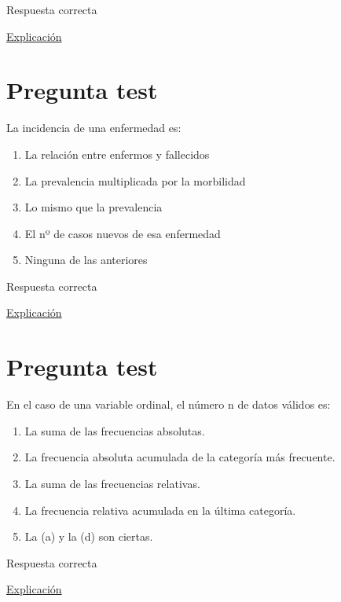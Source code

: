 \documentclass[
]{book}
\providecommand{\tightlist}{%
  \setlength{\itemsep}{0pt}\setlength{\parskip}{0pt}}
\begin{document}
Respuesta correcta

\href{https://www.salusplay.com/apuntes/apuntes-metodologia-de-la-investigacion/tema-4-el-proceso-de-investigacion-fases-de-realizacion-de-una-investigacion-cientifica/2}{Explicación}

\hypertarget{pregunta-test-7}{%
\section{Pregunta test}\label{pregunta-test-7}}

La incidencia de una enfermedad es:

\begin{enumerate}
\def\labelenumi{\alph{enumi})}
\tightlist
\item
  La relación entre enfermos y fallecidos
\item
  La prevalencia multiplicada por la morbilidad
\item
  Lo mismo que la prevalencia
\item
  El nº de casos nuevos de esa enfermedad
\item
  Ninguna de las anteriores
\end{enumerate}

Respuesta correcta

\href{https://medlineplus.gov/spanish/ency/article/002387.htm}{Explicación}

\hypertarget{pregunta-test-8}{%
\section{Pregunta test}\label{pregunta-test-8}}

En el caso de una variable ordinal, el número n de datos válidos es:

\begin{enumerate}
\def\labelenumi{\alph{enumi})}
\tightlist
\item
  La suma de las frecuencias absolutas.
\item
  La frecuencia absoluta acumulada de la categoría más frecuente.
\item
  La suma de las frecuencias relativas.
\item
  La frecuencia relativa acumulada en la última categoría.
\item
  La (a) y la (d) son ciertas.
\end{enumerate}

Respuesta correcta

\href{https://1fjmanzano.github.io/bioestadistica/tablas-de-frecuencias.html}{Explicación}
\end{document}
